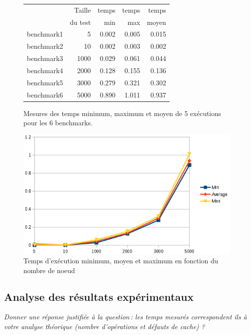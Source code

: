 \documentclass[a4paper, 10pt, french]{article}
\begin{document}
	\begin{figure}[!h]
		\begin{center}
			\begin{tabular}{|l||r||r|r|r||}
				\hline
				\hline
				& Taille         & temps     & temps   & temps \\
				& du test     & min       & max     & moyen \\
				\hline
				\hline
				benchmark1 & 5   & 0.002     & 0.005   & 0.015 \\
				\hline
				benchmark2 & 10  & 0.002     & 0.003   & 0.002 \\
				\hline
				benchmark3 & 1000  & 0.029     & 0.061   & 0.044 \\
				\hline
				benchmark4 & 2000  & 0.128    & 0.155    & 0.136 \\
				\hline
				benchmark5 & 3000  & 0.279    & 0.321    & 0.302 \\
				\hline
				benchmark6 & 5000  & 0.890    & 1.011    & 0.937 \\
				\hline
				\hline
			\end{tabular}
			\caption{Mesures des temps minimum, maximum et moyen de 5 exécutions pour les 6 benchmarks.}
			\label{table-temps}

			\vspace{2cm}
			\includegraphics[scale=0.6]{avg_comp_iter_graph.png}
			\caption{Temps d'exécution minimum, moyen et maximum en fonction du nombre de noeud}
		\end{center}
	\end{figure}

\subsection{Analyse des résultats expérimentaux}
{\em Donner  une réponse justifiée  à la question\,: 
			  les  temps mesurés correspondent ils  à votre analyse théorique (nombre d’opérations et défauts de cache) ?
}
\end{document}
